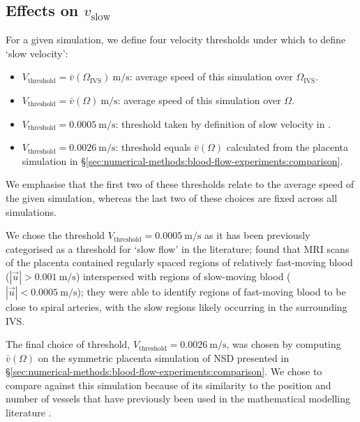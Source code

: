         \subsection{Effects on \texorpdfstring{$v_\text{slow}$}{slow velocity percentage}} \label{sec:nutrient-uptake:slow-velocity-percentage}
            For a given simulation, we define four velocity thresholds under which to define `slow velocity':
            \begin{itemize}
                \item $V_\text{threshold} = \bar{v}(\Omega_\text{IVS})~\unit{\metre\per\second}$: average speed of this simulation over $\Omega_\text{IVS}$. 
                \item $V_\text{threshold} = \bar{v}(\Omega)~\unit{\metre\per\second}$: average speed of this simulation over $\Omega$.
                \item $V_\text{threshold} = \qty{0.0005}{\metre\per\second}$: threshold taken by definition of slow velocity in \citeauthor{dellschaftHaemodynamicsHumanPlacenta2020} \cite{dellschaftHaemodynamicsHumanPlacenta2020}.
                \item $V_\text{threshold} = \qty{0.0026}{\metre\per\second}$: threshold equals $\bar{v}(\Omega)$ calculated from the placenta simulation in \S\ref{sec:numerical-methods:blood-flow-experiments:comparison}.
            \end{itemize}
            We emphasise that the first two of these thresholds relate to the average speed of the given simulation, whereas the last two of these choices are fixed across all simulations. 
            
            We chose the threshold $V_\text{threshold} = \qty{0.0005}{\metre\per\second}$ as it has been previously categorised as a threshold for `slow flow' in the literature; \citeauthor{dellschaftHaemodynamicsHumanPlacenta2020} \cite{dellschaftHaemodynamicsHumanPlacenta2020} found that MRI scans of the placenta contained regularly spaced regions of relatively fast-moving blood ($|\vec{u}| > \qty{0.001}{\metre\per\second}$) interspersed with regions of slow-moving blood ($|\vec{u}| < \qty{0.0005}{\metre\per\second}$); they were able to identify regions of fast-moving blood to be close to spiral arteries, with the slow regions likely occurring in the surrounding IVS. 

            The final choice of threshold, $V_\text{threshold} = \qty{0.0026}{\metre\per\second}$, was chosen by computing $\bar{v}(\Omega)$ on the symmetric placenta simulation of NSD presented in \S\ref{sec:numerical-methods:blood-flow-experiments:comparison}. We chose to compare against this simulation because of its similarity to the position and number of vessels that have previously been used in the mathematical modelling literature \cite{lecarpentierComputationalFluidDynamic2016,chernyavskyMathematicalModelIntervillous2010}.

